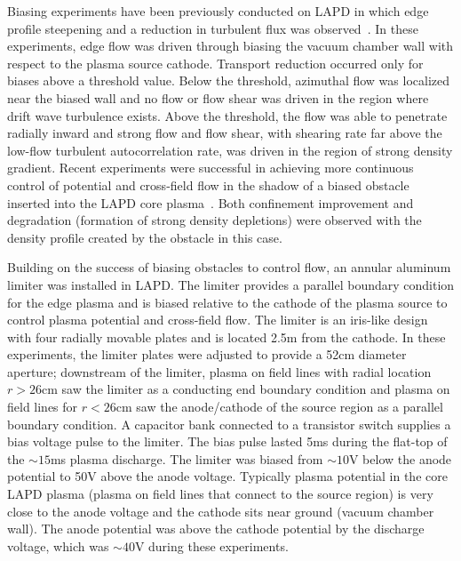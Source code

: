 \documentclass[aps,prl,amsmath,amssymb,preprint,superscriptaddress]{revtex4}
\begin{document}
Biasing experiments have been previously conducted on LAPD in which
edge profile steepening and a reduction in turbulent flux was
observed~\cite{maggs07,carter09}. In these experiments, edge flow was
driven through biasing the vacuum chamber wall with respect to the
plasma source cathode.  Transport reduction occurred only for biases
above a threshold value.  Below the threshold, azimuthal flow was
localized near the biased wall and no flow or flow shear was driven in
the region where drift wave turbulence exists.  Above the threshold,
the flow was able to penetrate radially inward and strong flow and
flow shear, with shearing rate far above the low-flow turbulent
autocorrelation rate, was driven in the region of strong density
gradient.   Recent experiments were successful in achieving more continuous control of potential and cross-field flow in the shadow of a biased obstacle inserted into the LAPD core plasma~\cite{zhou12}.  Both confinement improvement and degradation (formation of strong density depletions) were observed with the density profile created by the obstacle in this case.  

Building on the success of biasing obstacles to control flow, an
annular aluminum limiter was installed in LAPD. The limiter provides a parallel boundary condition for the edge plasma and is biased relative to the cathode of the plasma source to control plasma potential and cross-field flow.  The limiter is
an iris-like design with four radially movable plates and is located 2.5m from
the cathode.  In these experiments, the limiter plates were adjusted
to provide a 52cm diameter aperture; downstream of the
limiter, plasma on field lines with radial location $r>26$cm saw the
limiter as a conducting end boundary condition and plasma on field
lines for $r<26$cm saw the anode/cathode of the source region as a
parallel boundary condition.  A capacitor bank connected to a transistor switch supplies a bias voltage pulse to the limiter.  The
bias pulse lasted 5ms during the flat-top of the $\sim 15$ms plasma
discharge. The limiter was biased from $\sim 10$V below the anode
potential to 50V above the anode voltage.  Typically plasma potential
in the core LAPD plasma (plasma on field lines that connect to the
source region) is very close to the anode voltage and the cathode sits
near ground (vacuum chamber wall).  The anode potential was above the
cathode potential by the discharge voltage, which was $\sim 40$V during these experiments.
\end{document}
